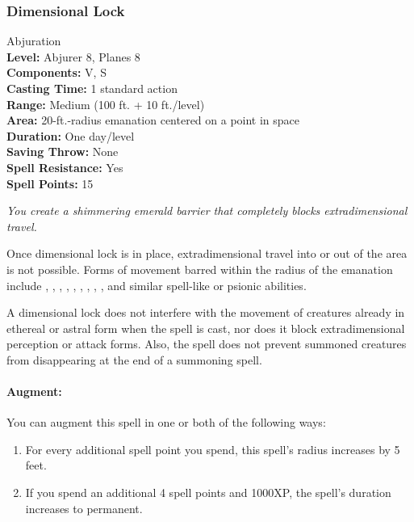 \subsubsection{Dimensional Lock}
\label{Spell:DimensionalLock}
Abjuration
\\ \textbf{Level:} Abjurer 8, Planes 8
\\ \textbf{Components:} V, S
\\ \textbf{Casting Time:} 1 standard action
\\ \textbf{Range:} Medium (100 ft. + 10 ft./level)
\\ \textbf{Area:} 20-ft.-radius emanation centered on a point in space
\\ \textbf{Duration:} One day/level
\\ \textbf{Saving Throw:} None
\\ \textbf{Spell Resistance:} Yes
\\ \textbf{Spell Points:} 15

\emph{You create a shimmering emerald barrier that completely blocks extradimensional travel. }

Once dimensional lock is in place, extradimensional travel into or out of the area is not possible. 
Forms of movement barred within the radius of the emanation include , , , , , , , , , and similar spell-like or psionic abilities.

A dimensional lock does not interfere with the movement of creatures already in ethereal or astral form when the spell is cast, 
nor does it block extradimensional perception or attack forms. 
Also, the spell does not prevent summoned creatures from disappearing at the end of a summoning spell.

\paragraph{Augment:} You can augment this spell in one or both of the following ways:
\begin{enumerate}
 \item For every additional spell point you spend, this spell's radius increases by 5 feet.
 \item If you spend an additional 4 spell points and 1000XP, the spell's duration increases to permanent.
\end{enumerate}
